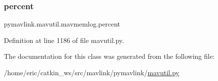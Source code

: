 \mbox{\label{classpymavlink_1_1mavutil_1_1mavmemlog_a44ce7e3b3214bec1c9aaa2484cd7ebad}} 
\subsubsection{\texorpdfstring{percent}{percent}}
{\footnotesize\ttfamily pymavlink.\+mavutil.\+mavmemlog.\+percent}



Definition at line 1186 of file mavutil.\+py.



The documentation for this class was generated from the following file\+:\begin{DoxyCompactItemize}
\item 
/home/eric/catkin\+\_\+ws/src/mavlink/pymavlink/\mbox{\hyperlink{mavutil_8py}{mavutil.\+py}}\end{DoxyCompactItemize}

